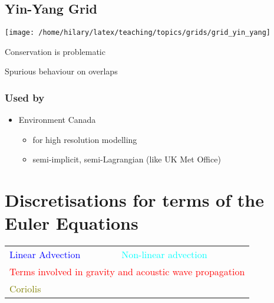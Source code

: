 \begin{minipage}[t][0.5\paperheight]{0.48\columnwidth}%

\subsection{Yin-Yang Grid}

\texttt{[image: /home/hilary/latex/teaching/topics/grids/grid\_yin\_yang]}

Conservation is problematic

Spurious behaviour on overlaps%
\end{minipage} \hfill{}%
\begin{minipage}[t]{0.47\columnwidth}%

\subsubsection*{Used by}
\begin{itemize}
\item Environment Canada
\begin{itemize}
\item for high resolution modelling
\item semi-implicit, semi-Lagrangian (like UK Met Office)
\end{itemize}
\end{itemize}
%
\end{minipage}

\clearpage{}

\section{Discretisations for terms of the Euler Equations}

\begin{tabular}{ll}
\textcolor{blue}{Linear Advection}\hspace{1cm} & \textcolor{cyan}{Non-linear advection}\tabularnewline
\multicolumn{2}{l}{\textcolor{red}{Terms involved in gravity and acoustic wave propagation}}\tabularnewline
\multicolumn{2}{l}{\textcolor{olive}{Coriolis}}\tabularnewline
\end{tabular}

